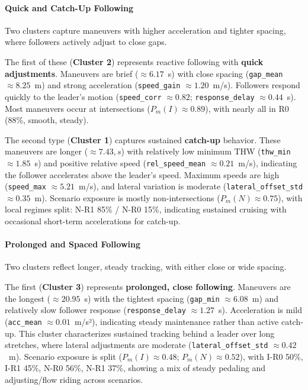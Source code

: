 \paragraph{Quick and Catch-Up Following}

Two clusters capture maneuvers with higher acceleration and tighter spacing, where followers actively adjust to close gaps.

The first of these (\textbf{Cluster 2}) represents reactive following with \textbf{quick adjustments}. Maneuvers are brief ($\approx 6.17$~s) with close spacing (\verb|gap_mean| $\approx 8.25$~m) and strong acceleration (\verb|speed_gain| $\approx 1.20$~m/s). Followers respond quickly to the leader’s motion (\verb|speed_corr| $ \approx 0.82$; \verb|response_delay| $\approx 0.44$~s). Most maneuvers occur at intersections ($ P_m(I) \approx 0.89 $), with nearly all in R0 (88\%, smooth, steady).


The second type (\textbf{Cluster 1}) captures sustained \textbf{catch-up} behavior. These maneuvers are longer ($\approx 7.43,s$) with relatively low minimum THW (\verb|thw_min| $\approx 1.85$~s) and positive relative speed (\verb|rel_speed_mean| $\approx 0.21$~m/s), indicating the follower accelerates above the leader’s speed. Maximum speeds are high (\verb|speed_max| $\approx 5.21$~m/s), and lateral variation is moderate (\verb|lateral_offset_std| $\approx 0.35$~m). Scenario exposure is mostly non-intersections ($ P_m(N) \approx 0.75 $), with local regimes split: N-R1 85\% / N-R0 15\%, indicating sustained cruising with occasional short-term accelerations for catch-up.


\paragraph{Prolonged and Spaced Following}

Two clusters reflect longer, steady tracking, with either close or wide spacing.

The first (\textbf{Cluster 3}) represents \textbf{prolonged, close following}. Maneuvers are the longest ($\approx 20.95$~s) with the tightest spacing (\verb|gap_min| $\approx 6.08$~m) and relatively slow follower response (\verb|response_delay| $\approx 1.27$~s). Acceleration is mild (\verb|acc_mean| $\approx 0.01$~m/s²), indicating steady maintenance rather than active catch-up. This cluster characterizes sustained tracking behind a leader over long stretches, where lateral adjustments are moderate (\verb|lateral_offset_std| $\approx 0.42$~m). Scenario exposure is split ($ P_m(I) \approx 0.48 $; $ P_m(N) \approx 0.52 $), with I-R0 50\%, I-R1 45\%, N-R0 56\%, N-R1 37\%, showing a mix of steady pedaling and adjusting/flow riding across scenarios.

